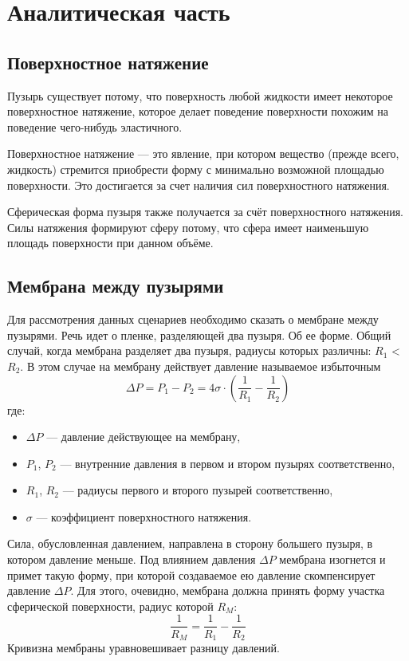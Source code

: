 \chapter{Аналитическая часть}
\section{Поверхностное натяжение}
Пузырь существует потому, что поверхность любой жидкости имеет некоторое поверхностное натяжение, которое делает поведение поверхности похожим на поведение чего-нибудь эластичного.

Поверхностное натяжение \cite{surface_tension} — это явление, при котором вещество (прежде всего, жидкость) стремится приобрести форму с минимально возможной площадью поверхности. Это достигается за счет наличия сил поверхностного натяжения.

Сферическая форма пузыря также получается за счёт поверхностного натяжения. Силы натяжения формируют сферу потому, что сфера имеет наименьшую площадь поверхности при данном объёме.  

\section{Мембрана между пузырями}

Для рассмотрения данных сценариев необходимо сказать о мембране между пузырями. Речь идет о пленке, разделяющей два пузыря. Об ее форме. Общий случай, когда мембрана разделяет два пузыря, радиусы которых различны: $R_{1}$ < $R_{2}$. В этом случае на мембрану действует давление называемое избыточным \cite{geguzin}
\begin{equation}
\Delta P = P_{1} - P_{2} = 4 \sigma \cdot (\frac{1}{R_{1}}-\frac{1}{R_{2}})
\end{equation}
где:
\begin{itemize}
	\item $\Delta P$ --- давление действующее на мембрану,
	\item $P_{1}$, $P_{2}$ --- внутренние давления в первом и втором пузырях соответственно,
	\item $R_{1}$, $R_{2}$ --- радиусы первого и второго пузырей соответственно,
	\item $\sigma$ --- коэффициент поверхностного натяжения.
\end{itemize}
Сила, обусловленная давлением, направлена в сторону большего пузыря, в котором давление меньше. Под влиянием давления $\Delta P$ мембрана изогнется и примет такую форму, при которой создаваемое ею давление скомпенсирует давление $\Delta P$. Для этого, очевидно, мембрана должна принять форму участка сферической поверхности, радиус которой $R_{M}$:
\begin{equation}
\frac{1}{R_{M}} = \frac{1}{R_{1}} - \frac{1}{R_{2}}
\end{equation}
Кривизна мембраны уравновешивает разницу давлений.

